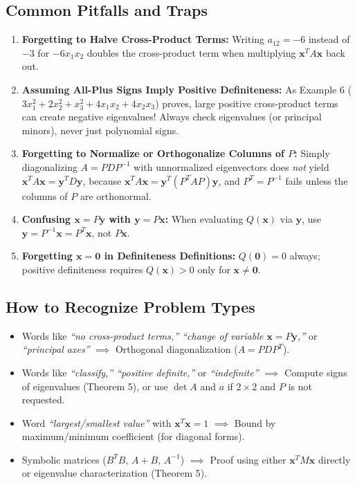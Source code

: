 \documentclass[11pt, letterpaper]{article}
\theoremstyle{definition}
\theoremstyle{remark}
\begin{document}
\subsection{Common Pitfalls and Traps}
\begin{enumerate}
    \item \textbf{Forgetting to Halve Cross-Product Terms:} Writing $a_{12} = -6$ instead of $-3$ for $-6x_1x_2$ doubles the cross-product term when multiplying $\mathbf{x}^T A \mathbf{x}$ back out.
    \item \textbf{Assuming All-Plus Signs Imply Positive Definiteness:} As Example 6 ($3x_1^2 + 2x_2^2 + x_3^2 + 4x_1x_2 + 4x_2x_3$) proves, large positive cross-product terms can create negative eigenvalues! Always check eigenvalues (or principal minors), never just polynomial signs.
    \item \textbf{Forgetting to Normalize or Orthogonalize Columns of $P$:} Simply diagonalizing $A = P D P^{-1}$ with unnormalized eigenvectors does \emph{not} yield $\mathbf{x}^T A \mathbf{x} = \mathbf{y}^T D \mathbf{y}$, because $\mathbf{x}^T A \mathbf{x} = \mathbf{y}^T (P^T A P) \mathbf{y}$, and $P^T = P^{-1}$ fails unless the columns of $P$ are orthonormal.
    \item \textbf{Confusing $\mathbf{x} = P\mathbf{y}$ with $\mathbf{y} = P\mathbf{x}$:} When evaluating $Q(\mathbf{x})$ via $\mathbf{y}$, use $\mathbf{y} = P^{-1}\mathbf{x} = P^T \mathbf{x}$, not $P\mathbf{x}$.
    \item \textbf{Forgetting $\mathbf{x} = \mathbf{0}$ in Definiteness Definitions:} $Q(\mathbf{0}) = 0$ always; positive definiteness requires $Q(\mathbf{x}) > 0$ only for $\mathbf{x} \ne \mathbf{0}$.
\end{enumerate}

\subsection{How to Recognize Problem Types}
\begin{itemize}
    \item Words like \emph{``no cross-product terms,'' ``change of variable $\mathbf{x} = P\mathbf{y}$,''} or \emph{``principal axes''} $\implies$ Orthogonal diagonalization ($A = P D P^T$).
    \item Words like \emph{``classify,'' ``positive definite,''} or \emph{``indefinite''} $\implies$ Compute signs of eigenvalues (Theorem 5), or use $\det A$ and $a$ if $2 \times 2$ and $P$ is not requested.
    \item Word \emph{``largest/smallest value''} with $\mathbf{x}^T \mathbf{x} = 1$ $\implies$ Bound by maximum/minimum coefficient (for diagonal forms).
    \item Symbolic matrices ($B^T B$, $A + B$, $A^{-1}$) $\implies$ Proof using either $\mathbf{x}^T M \mathbf{x}$ directly or eigenvalue characterization (Theorem 5).
\end{itemize}
\end{document}
